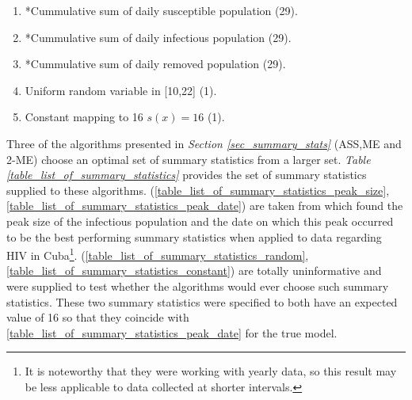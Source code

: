 \documentclass[11pt,a4paper]{article}
\theoremstyle{break}
\begin{document}
\begin{table}[H]
\begin{framed}
{\begin{multicols}{2}
\begin{enumerate}[label=(S\arabic*)]
            \item *Cummulative sum of daily susceptible population (29).
            \item *Cummulative sum of daily infectious population (29).\label{table_list_of_summary_statistics_cum_sum_infectious}
            \item *Cummulative sum of daily removed population (29).
            \item Uniform random variable in [10,22] (1).\label{table_list_of_summary_statistics_random}
            \item Constant mapping to 16 $s(x)=16$ (1).\label{table_list_of_summary_statistics_constant}
          \end{enumerate}
        \end{multicols}
      }
    \end{framed}
    \caption{Comprehensive set of 99 summary statistics supplied to the ASS, ME and 2-ME algorithms. An asterisk (*) denotes that a summary statistic of the natural logarithm of this value was supplied as well. In brackets is the dimensionality of each summary statistic when applied to the SIR-model depicted in \textit{Figure \ref{fig_example_standard_sir_model}} which runs for 30 time-periods.}
    \label{table_list_of_summary_statistics}
  \end{table}

  \par Three of the algorithms presented in \textit{Section \ref{sec_summary_stats}} (ASS,ME and 2-ME) choose an optimal set of summary statistics from a larger set. \textit{Table \ref{table_list_of_summary_statistics}} provides the set of summary statistics supplied to these algorithms. (\ref{table_list_of_summary_statistics_peak_size},\ref{table_list_of_summary_statistics_peak_date}) are taken from \cite[]{hiv_with_contact_tracing} which found the peak size of the infectious population and the date on which this peak occurred to be the best performing summary statistics when applied to data regarding HIV in Cuba\footnote{It is noteworthy that they were working with yearly data, so this result may be less applicable to data collected at shorter intervals.}. (\ref{table_list_of_summary_statistics_random},\ref{table_list_of_summary_statistics_constant}) are totally uninformative and were supplied to test whether the algorithms would ever choose such summary statistics. These two summary statistics were specified to both have an expected value of 16 so that they coincide with \ref{table_list_of_summary_statistics_peak_date} for the true model.
\end{document}

